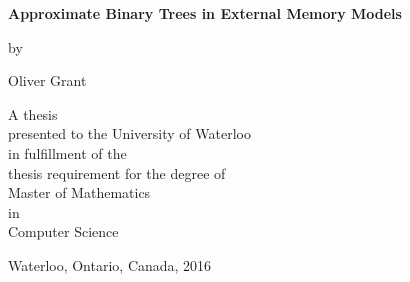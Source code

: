 \pagestyle{empty}

\begin{titlepage}
        \begin{center}
        \vspace*{1.0cm}

        \Huge
        {\bf Approximate Binary Trees in External Memory Models }

        \vspace*{1.0cm}

        \normalsize
        by \\

        \vspace*{1.0cm}

        \Large
        Oliver Grant \\

        \vspace*{3.0cm}

        \normalsize
        A thesis \\
        presented to the University of Waterloo \\ 
        in fulfillment of the \\
        thesis requirement for the degree of \\
        Master of Mathematics \\
        in \\
        Computer Science \\

        \vspace*{2.0cm}

        Waterloo, Ontario, Canada, 2016 \\

        \vspace*{1.0cm}

        \end{center}
\end{titlepage}

\pagestyle{plain}
\setcounter{page}{2}

\cleardoublepage %
 


